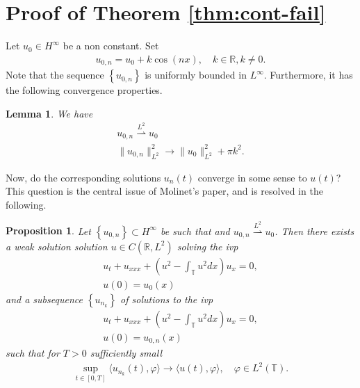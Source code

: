 \documentclass[12pt,reqno]{amsart}
\numberwithin{equation}{section}  %
\newcommand{\rr}{\mathbb{R}}
\newcommand{\ci}{\mathbb{T}}
\newcommand{\vp}{\varphi}
\newtheorem{lemma}[theorem]{Lemma}
\newtheorem{proposition}[theorem]{Proposition}
\begin{document}
%
%
%
%
%
%
%
%
\section{Proof of Theorem \ref{thm:cont-fail}}
\label{sec:pf-thm}
Let $u_{0} \in H^{\infty}$ be a non constant. Set
%
%
\begin{equation}
  \label{ill-pos-init-data}
\begin{split}
  u_{0,n} = u_{0} + k \cos(nx), \quad k\in \rr, k \neq 0.
\end{split}
\end{equation}
%
Note that the sequence $\left\{ u_{0,n} \right\}$ is uniformly bounded in $L^{\infty}$.
Furthermore, it has the following convergence properties.
%
%
%
%
%
%
%                
%
%
%
%
\begin{lemma}
We have
%
%
\begin{gather}
  u_{0,n}\overset{L^{2}}{\rightharpoonup} u_{0}
  \\
  \| u_{0,n} \|_{L^{2}}^{2} \to \| u_{0} \|_{L^{2}}^{2} + \pi k^{2}.
\end{gather}
\label{lem:conv-prop-init}
\end{lemma}
%
%
%
%
Now, do the corresponding solutions $u_{n}(t)$ converge in some sense to
$u(t)$? This question is
the central issue of Molinet's paper, and is resolved in the following.
%
%
%
%
%
%
%
%
\begin{proposition}
  Let $\left\{ u_{0,n} \right\} \subset
  H^{\infty}$ be such that and $u_{0,n} \overset{L^{2}}{\rightharpoonup} u_{0}$.
  Then there exists a weak solution solution $u \in C(\rr,
  L^{2})$ solving the ivp
  \begin{gather}
    \label{n-mkdv}
    u_{t} + u_{xxx} + \left( u^{2} - \int_{\ci} u^{2} dx \right)u_{x} = 0,
    \\
    u(0) = u_{0}(x)
    \label{n-mkdv-init}
  \end{gather}
  and a subsequence $\left\{ u_{n_{k}} \right\}$ of solutions to the ivp
  \begin{gather}
    u_{t} + u_{xxx} + \left( u^{2} - \int_{\ci} u^{2} dx \right)u_{x} = 0,
    \\
    u(0) = u_{0,n}(x)
  \end{gather}
%
%
  such that for $T > 0$ sufficiently small
  \begin{equation*}
  \begin{split}
    \sup_{t \in [0, T]} \langle u_{n_{k}}(t), \vp \rangle \to \langle
    u(t), \vp
    \rangle, \quad \vp \in L^{2}(\ci).
  \end{split}
  \end{equation*}
\label{prop:key-paper}
\end{proposition}
\end{document}
